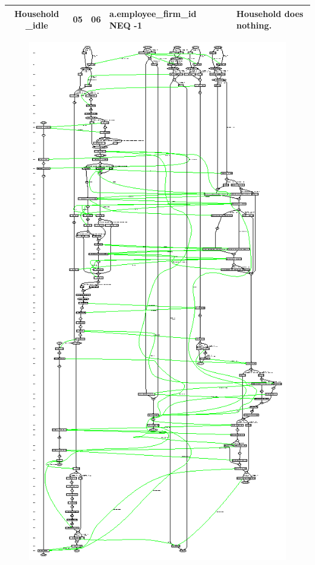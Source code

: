 \begin{landscape}
\begin{table}[!htb]
\begin{center}
\begin{tabular}{|c|c|c|l|c|c|l|}
\hline {\parbox[l]{3cm}{Household \_idle}}& {\parbox[l]{3cm}{05}}&
{\parbox[l]{3cm}{06}}&{\parbox[l]{3cm}{a.employee\_firm\_id NEQ -1}}
 & & & {\parbox[l]{3cm}{Household does nothing.}}
 \\
\hline



\end{tabular}\end{center}\label{tab:labourhh}
\end{table}
\end{landscape}





 \begin{figure}[!htb]
 \begin{center}
 \includegraphics*[scale=2.0]{stategraph-labour.ps}

\end{center}
\end{figure}
